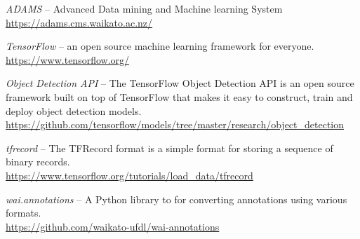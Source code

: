 
\begin{thebibliography}{999}

		\textit{ADAMS} -- Advanced Data mining and Machine learning System \\
		\url{https://adams.cms.waikato.ac.nz/}{}
		
                \textit{TensorFlow} -- an open source machine learning framework for everyone. \\
		\url{https://www.tensorflow.org/}{}

                \textit{Object Detection API} -- The TensorFlow Object Detection API is an open
                source framework built on top of TensorFlow that makes it easy to construct,
                train and deploy object detection models. \\
		\url{https://github.com/tensorflow/models/tree/master/research/object_detection}{}

                \textit{tfrecord} -- The TFRecord format is a simple format for storing a
                sequence of binary records. \\
		\url{https://www.tensorflow.org/tutorials/load_data/tfrecord}{}

                \textit{wai.annotations} -- A Python library to for converting annotations using various formats. \\
		\url{https://github.com/waikato-ufdl/wai-annotations}{}

\end{thebibliography}
